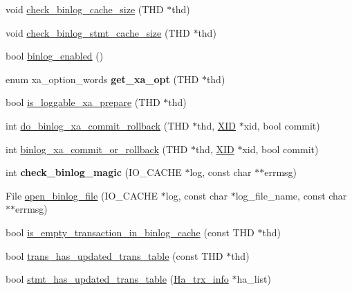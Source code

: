 \begin{DoxyCompactItemize}
\item 
void \mbox{\hyperlink{group__Binary__Log_ga63c6fcd1b8e84116f7bcec46e7b25caa}{check\+\_\+binlog\+\_\+cache\+\_\+size}} (T\+HD $\ast$thd)
\item 
void \mbox{\hyperlink{group__Binary__Log_ga7a0a12298d22d080b68e55f324cd59bd}{check\+\_\+binlog\+\_\+stmt\+\_\+cache\+\_\+size}} (T\+HD $\ast$thd)
\item 
bool \mbox{\hyperlink{group__Binary__Log_ga46468c405fde69f126c1bcb343c85c90}{binlog\+\_\+enabled}} ()
\item 
\mbox{\label{group__Binary__Log_gab41aafa88852810046fb7bcdaa4522ea}} 
enum xa\+\_\+option\+\_\+words {\bfseries get\+\_\+xa\+\_\+opt} (T\+HD $\ast$thd)
\item 
bool \mbox{\hyperlink{group__Binary__Log_ga0f5702b2bc03f66bc0a37c05ff1c84e8}{is\+\_\+loggable\+\_\+xa\+\_\+prepare}} (T\+HD $\ast$thd)
\item 
int \mbox{\hyperlink{group__Binary__Log_ga92b6d633ef75cd075586ba82ef3f5c9e}{do\+\_\+binlog\+\_\+xa\+\_\+commit\+\_\+rollback}} (T\+HD $\ast$thd, \mbox{\hyperlink{structxid__t}{X\+ID}} $\ast$xid, bool commit)
\item 
int \mbox{\hyperlink{group__Binary__Log_gab499865e2616dac2a882d7937a62d2aa}{binlog\+\_\+xa\+\_\+commit\+\_\+or\+\_\+rollback}} (T\+HD $\ast$thd, \mbox{\hyperlink{structxid__t}{X\+ID}} $\ast$xid, bool commit)
\item 
\mbox{\label{group__Binary__Log_ga24b696534d053643574f8ccf2bf5815f}} 
int {\bfseries check\+\_\+binlog\+\_\+magic} (I\+O\+\_\+\+C\+A\+C\+HE $\ast$log, const char $\ast$$\ast$errmsg)
\item 
File \mbox{\hyperlink{group__Binary__Log_ga79ed24f2c1a0645530426f4346470781}{open\+\_\+binlog\+\_\+file}} (I\+O\+\_\+\+C\+A\+C\+HE $\ast$log, const char $\ast$log\+\_\+file\+\_\+name, const char $\ast$$\ast$errmsg)
\item 
bool \mbox{\hyperlink{group__Binary__Log_ga47165cf06d3f64979787a85b6b43f3ac}{is\+\_\+empty\+\_\+transaction\+\_\+in\+\_\+binlog\+\_\+cache}} (const T\+HD $\ast$thd)
\item 
bool \mbox{\hyperlink{group__Binary__Log_ga25239dc38f22eeef6e1aea243af6fd9a}{trans\+\_\+has\+\_\+updated\+\_\+trans\+\_\+table}} (const T\+HD $\ast$thd)
\item 
bool \mbox{\hyperlink{group__Binary__Log_gaf43af0e4821421ea58375e7d4943c6c0}{stmt\+\_\+has\+\_\+updated\+\_\+trans\+\_\+table}} (\mbox{\hyperlink{classHa__trx__info}{Ha\+\_\+trx\+\_\+info}} $\ast$ha\+\_\+list)

\end{DoxyCompactItemize}
